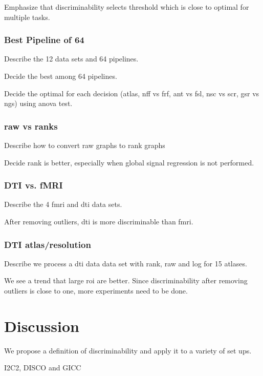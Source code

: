 \documentclass{article}
\begin{document}
 Emphasize that discriminability selects threshold which is close to optimal for multiple tasks.



\subsubsection{Best Pipeline of 64}
 Describe the 12 data sets and 64 pipelines. 

 Decide the best among 64 pipelines.

 Decide the optimal for each decision (atlas, nff vs frf, ant vs fsl, nsc vs scr, gsr vs ngs) using anova test.




\subsubsection{raw vs ranks}
 Describe how to convert raw graphs to rank graphs

 Decide rank is better, especially when global signal regression is not performed.

\subsubsection{DTI vs. fMRI}
 Describe the 4 fmri and dti data sets.

 After removing outliers, dti is more discriminable than fmri.

\subsubsection{DTI atlas/resolution}
 Describe we process a  dti data data set with rank, raw and log for 15 atlases. 

 We see a trend that large roi are better. Since discriminability after removing outliers is close to one, more experiments need to be done.



\section{Discussion}

 We propose a definition of discriminability and apply it to a variety of set ups.

 I2C2, DISCO and GICC




% 
% 
% 
% 
% 
% 
% 
% 



\appendix






\newpage
\small{


}
\end{document}
